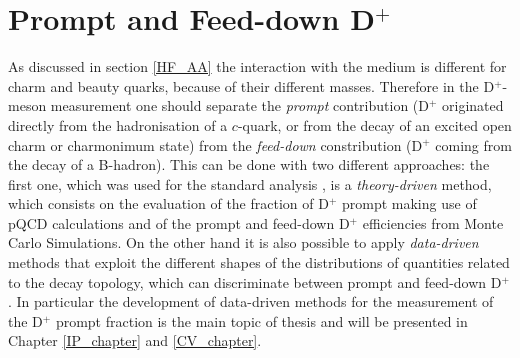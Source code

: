 \documentclass[b5paper,10pt,twoside,oldstyle,classica]{toptesi}
\begin{document}
\section{Prompt and Feed-down D$^+$}
As discussed in section \ref{HF_AA} the interaction with the medium is different for charm and beauty quarks, because of their different masses. Therefore in the D$^+$-meson measurement one should separate the \textit{prompt} contribution (D$^+$ originated directly from the hadronisation of a $c$-quark, or from the decay of an excited open charm or charmonimum state) from the \textit{feed-down} constribution (D$^+$ coming from the decay of a B-hadron). This can be done with two different approaches: the first one, which was used for the standard analysis \cite{Abelev:2014hha}, is a \textit{theory-driven} method, which consists on the evaluation of the fraction of D$^+$ prompt making use of pQCD calculations and of the prompt and feed-down D$^+$ efficiencies from Monte Carlo Simulations. On the other hand it is also possible to apply \textit{data-driven} methods that exploit the different shapes of the distributions of quantities related to the decay topology, which can discriminate between prompt and feed-down D$^+$. In particular the development of data-driven methods for the measurement of the D$^+$ prompt fraction is the main topic of thesis and will be presented in Chapter \ref{IP_chapter} and \ref{CV_chapter}.   
\end{document}

